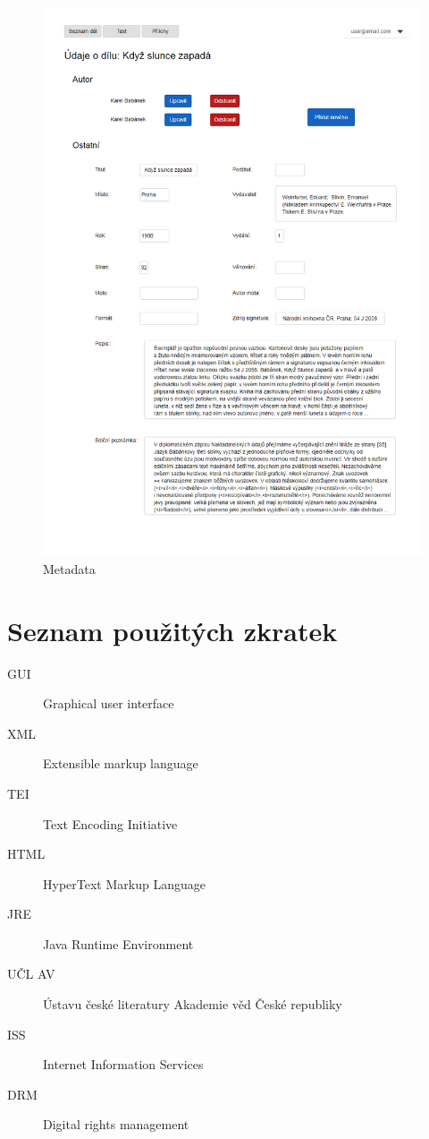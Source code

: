 \documentclass[thesis=B,czech]{FITthesis}[2012/06/26]
\begin{document}
    \begin {figure}[H]\centering
        \includegraphics[width=\textwidth]{images/metadata}
        \caption {Metadata}
        \label {fig:metadata}
    \end{figure}
\chapter{Seznam použitých zkratek}
\begin{description}
	\item[GUI] Graphical user interface
	\item[XML] Extensible markup language
	\item[TEI] Text Encoding Initiative
	\item[HTML] HyperText Markup Language
	\item[JRE] Java Runtime Environment
	\item[UČL AV] Ústavu české literatury Akademie věd České republiky
	\item[ISS] Internet Information Services
	\item[DRM] Digital rights management
\end{description}
\end{document}
